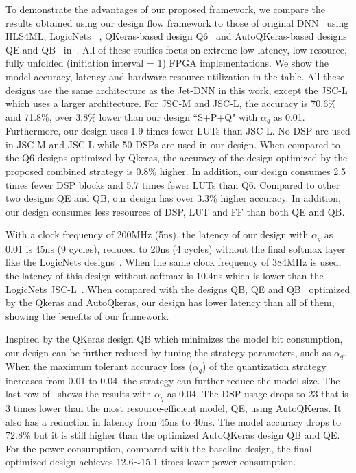 
To demonstrate the advantages of our proposed framework, we compare the results obtained using our design flow framework to those of original DNN~\cite{duarte2018fast} using HLS4ML, LogicNets~\cite{umuroglu2020logicnets} , QKeras-based design Q6~\cite{coelho2021automatic} and AutoQKeras-based designs QE and QB~\cite{coelho2021automatic} in~. All of these studies focus on extreme low-latency, low-resource, fully unfolded (initiation interval = 1) FPGA implementations. We show the model accuracy, latency and hardware resource utilization in the table. All these designs use the same architecture as the Jet-DNN in this work, except the JSC-L which uses a larger architecture. For JSC-M and JSC-L, the accuracy is 70.6\% and 71.8\%, over 3.8\% lower than our design ``S+P+Q" with $\alpha_q$ as 0.01. Furthermore, our design uses 1.9 times fewer LUTs than JSC-L. No DSP are used in JSC-M and JSC-L while 50 DSPs are used in our design.
When compared to the Q6 designs optimized by Qkeras, the accuracy of the design optimized by the proposed combined strategy is 0.8\% higher. In addition, our design consumes 2.5 times fewer DSP blocks and 5.7 times fewer LUTs than Q6. Compared to other two designs QE and QB, our design has over 3.3\% higher accuracy. In addition, our design consumes less resources of DSP, LUT and FF than both QE and QB. 

With a clock frequency of 200MHz (5ns), the latency of our design with $\alpha_q$ as 0.01 is 45ns (9 cycles), reduced to 20ns (4 cycles) without the final softmax layer like the LogicNets designs~\cite{umuroglu2020logicnets}. When the same clock frequency of 384MHz is used, the latency of this design without softmax is 10.4ns which is lower than the LogicNets JSC-L~\cite{umuroglu2020logicnets}. When compared with the designs QB, QE and QB~\cite{coelho2021automatic} optimized by the Qkeras and AutoQkeras, our design has lower latency than all of them, showing the benefits of our framework. 

Inspired by the QKeras design QB which minimizes the model bit consumption, our design can be further reduced by tuning the strategy parameters, such as $\alpha_q$. When the maximum tolerant accuracy loss ($\alpha_q$) of the quantization strategy increases from 0.01 to 0.04, the strategy can further reduce the model size. The last row of~ shows the results with $\alpha_q$ as 0.04. The DSP usage drops to 23 that is 3 times lower than the most resource-efficient model, QE, using AutoQKeras. It also has a reduction in latency from 45ns to 40ns. The model accuracy drops to 72.8\% but it is still higher than the optimized AutoQKeras design QB and QE. For the power consumption, compared with the baseline design, the final optimized design achieves 12.6$\sim$15.1 times lower power consumption. 

